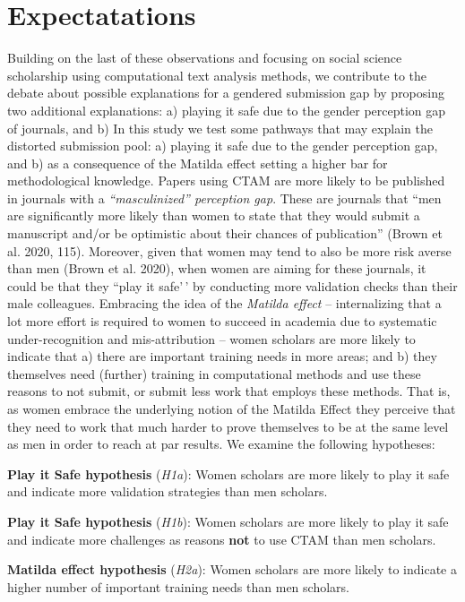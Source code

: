 \documentclass[
]{ccr}
\begin{document}
\hypertarget{expectatations}{%
\section{Expectatations}\label{expectatations}}

Building on the last of these observations and focusing on social
science scholarship using computational text analysis methods, we
contribute to the debate about possible explanations for a gendered
submission gap by proposing two additional explanations: a) playing it
safe due to the gender perception gap of journals, and b) In this study
we test some pathways that may explain the distorted submission pool: a)
playing it safe due to the gender perception gap, and b) as a
consequence of the Matilda effect setting a higher bar for
methodological knowledge. Papers using CTAM are more likely to be
published in journals with a \emph{``masculinized'' perception gap}.
These are journals that ``men are significantly more likely than women
to state that they would submit a manuscript and/or be optimistic about
their chances of publication'' (Brown et al. 2020, 115). Moreover, given
that women may tend to also be more risk averse than men (Brown et al.
2020), when women are aiming for these journals, it could be that they
``play it safe'\,' by conducting more validation checks than their male
colleagues. Embracing the idea of the \emph{Matilda effect} --
internalizing that a lot more effort is required to women to succeed in
academia due to systematic under-recognition and mis-attribution --
women scholars are more likely to indicate that a) there are important
training needs in more areas; and b) they themselves need (further)
training in computational methods and use these reasons to not submit,
or submit less work that employs these methods. That is, as women
embrace the underlying notion of the Matilda Effect they perceive that
they need to work that much harder to prove themselves to be at the same
level as men in order to reach at par results. We examine the following
hypotheses:

\textbf{Play it Safe hypothesis} (\emph{H1a}): Women scholars are more
likely to play it safe and indicate more validation strategies than men
scholars.

\textbf{Play it Safe hypothesis} (\emph{H1b}): Women scholars are more
likely to play it safe and indicate more challenges as reasons
\textbf{not} to use CTAM than men scholars.

\textbf{Matilda effect hypothesis} (\emph{H2a}): Women scholars are more
likely to indicate a higher number of important training needs than men
scholars.
\end{document}
